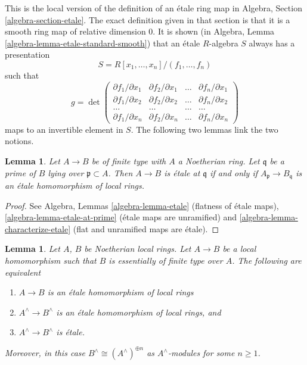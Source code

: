 \documentclass{stacks-project}
\theoremstyle{plain}
\newtheorem{lemma}[subsection]{Lemma}
\theoremstyle{definition}
\theoremstyle{remark}
\numberwithin{equation}{subsection}
\begin{document}
\noindent
This is the local version of the definition of an \'etale ring map in
Algebra, Section \ref{algebra-section-etale}.
The exact definition
given in that section is that it is a smooth ring map of relative
dimension $0$. It is shown (in
Algebra, Lemma \ref{algebra-lemma-etale-standard-smooth})
that an \'etale $R$-algebra $S$ always has a presentation
$$
S = R[x_1, \ldots, x_n]/(f_1, \ldots, f_n)
$$
such that
$$
g =
\det
\left(
\begin{matrix}
\partial f_1/\partial x_1 &
\partial f_2/\partial x_1 &
\ldots &
\partial f_n/\partial x_1 \\
\partial f_1/\partial x_2 &
\partial f_2/\partial x_2 &
\ldots &
\partial f_n/\partial x_2 \\
\ldots & \ldots & \ldots & \ldots \\
\partial f_1/\partial x_n &
\partial f_2/\partial x_n &
\ldots &
\partial f_n/\partial x_n
\end{matrix}
\right)
$$
maps to an invertible element in $S$. The following two lemmas link the two
notions.

\begin{lemma}
\label{lemma-characterize-etale-Noetherian}
Let $A \to B$ be of finite type with $A$ a Noetherian ring.
Let $\mathfrak q$ be a prime of $B$ lying over $\mathfrak p \subset A$.
Then $A \to B$ is \'etale at $\mathfrak q$ if and only if
$A_{\mathfrak p} \to B_{\mathfrak q}$ is an \'etale homomorphism
of local rings.
\end{lemma}

\begin{proof}
See Algebra, Lemmas \ref{algebra-lemma-etale} (flatness of \'etale maps),
\ref{algebra-lemma-etale-at-prime} (\'etale maps are unramified)
and \ref{algebra-lemma-characterize-etale} (flat and unramified maps
are \'etale).
\end{proof}

\begin{lemma}
\label{lemma-characterize-etale-completions}
Let $A$, $B$ be Noetherian local rings.
Let $A \to B$ be a local homomorphism such that $B$ is essentially of
finite type over $A$.
The following are equivalent
\begin{enumerate}
\item $A \to B$ is an \'etale homomorphism of local rings
\item $A^\wedge \to B^\wedge$ is an \'etale homomorphism of local rings, and
\item $A^\wedge \to B^\wedge$ is \'etale.
\end{enumerate}
Moreover, in this case $B^\wedge \cong (A^\wedge)^{\oplus n}$ as
$A^\wedge$-modules for some $n \geq 1$.
\end{lemma}
\end{document}
